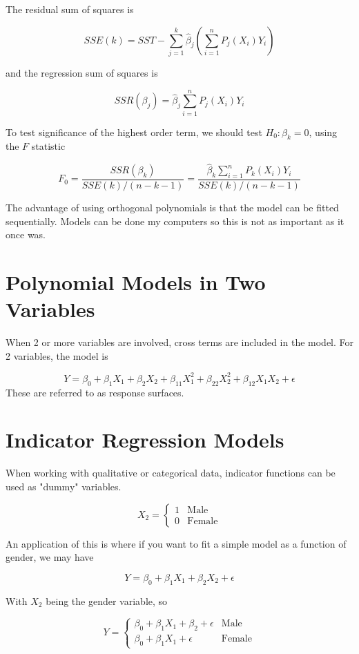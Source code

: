 The residual sum of squares is 

\[SSE(k) = SST - \sum_{j=1}^k \hat{\beta}_j\left(\sum_{i=1}^n P_j(X_i)Y_i\right)\]

and the regression sum of squares is 

\[SSR(\beta_j) = \hat{\beta}_j\sum_{i=1}^nP_j(X_i)Y_i\]

To test significance of the highest order term, we should test $H_0: \beta_k = 0$, using the $F$ statistic

\[F_0 = \frac{SSR(\beta_k)}{SSE(k)/(n-k-1)} = \frac{\hat{\beta}_k\sum_{i=1}^n P_k(X_i)Y_i}{SSE(k)/(n-k-1)}\]

The advantage of using orthogonal polynomials is that the model can be fitted sequentially. Models can be done my computers so this is not as important as it once was.

\section{Polynomial Models in Two Variables}

When 2 or more variables are involved, cross terms are included in the model. For 2 variables, the model is 

\[Y = \beta_0 + \beta_1X_1 + \beta_2X_2 + \beta_{11}X_1^2 + \beta_{22}X_2^2 + \beta_{12}X_1X_2 + \epsilon\]
\noindent
These are referred to as response surfaces.

\section{Indicator Regression Models}

When working with qualitative or categorical data, indicator functions can be used as "dummy" variables. 

\[X_2 = \begin{cases}
    1 & \text{Male} \\
    0 & \text{Female}
\end{cases}\]

An application of this is where if you want to fit a simple model as a function of gender, we may have

\[Y = \beta_0 + \beta_1X_1 + \beta_2X_2 + \epsilon\]

With $X_2$ being the gender variable, so 

\[Y = \begin{cases}
    \beta_0 + \beta_1X_1 + \beta_2 + \epsilon & \text{Male}\\
    \beta_0 + \beta_1X_1 + \epsilon & \text{Female}
\end{cases}\]


